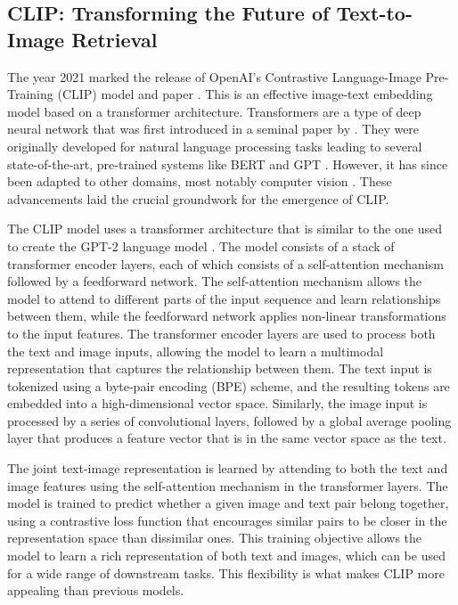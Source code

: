 \documentclass{l4proj}
\begin{document}
\subsection{CLIP: Transforming the Future of Text-to-Image Retrieval}
\label{sec:background_clip}
The year 2021 marked the release of OpenAI's Contrastive Language-Image Pre-Training (CLIP) model and paper \citep{radford2021clip}. This is an effective image-text embedding model based on a transformer architecture. Transformers are a type of deep neural network that was first introduced in a seminal paper by \cite{vaswani2017attention}. They were originally developed for natural language processing tasks leading to several state-of-the-art, pre-trained systems like BERT \citep{devlin2018bert} and GPT \citep{radford2018gpt}. However, it has since been adapted to other domains, most notably computer vision \citep{dosovitskiy2020vit}. These advancements laid the crucial groundwork for the emergence of CLIP.

The CLIP model uses a transformer architecture that is similar to the one used to create the GPT-2 language model \citep{radford2019gpt2}. The model consists of a stack of transformer encoder layers, each of which consists of a self-attention mechanism followed by a feedforward network. The self-attention mechanism allows the model to attend to different parts of the input sequence and learn relationships between them, while the feedforward network applies non-linear transformations to the input features. The transformer encoder layers are used to process both the text and image inputs, allowing the model to learn a multimodal representation that captures the relationship between them. The text input is tokenized using a byte-pair encoding (BPE) scheme, and the resulting tokens are embedded into a high-dimensional vector space. Similarly, the image input is processed by a series of convolutional layers, followed by a global average pooling layer that produces a feature vector that is in the same vector space as the text.

The joint text-image representation is learned by attending to both the text and image features using the self-attention mechanism in the transformer layers. The model is trained to predict whether a given image and text pair belong together, using a contrastive loss function that encourages similar pairs to be closer in the representation space than dissimilar ones. This training objective allows the model to learn a rich representation of both text and images, which can be used for a wide range of downstream tasks. This flexibility is what makes CLIP more appealing than previous models.
\end{document}
